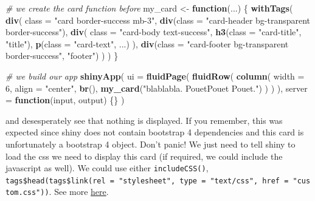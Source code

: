 \documentclass[]{book}
\newenvironment{Shaded}{\begin{snugshade}}{\end{snugshade}}
\newcommand{\CommentTok}[1]{\textcolor[rgb]{0.56,0.35,0.01}{\textit{#1}}}
\newcommand{\ControlFlowTok}[1]{\textcolor[rgb]{0.13,0.29,0.53}{\textbf{#1}}}
\newcommand{\DataTypeTok}[1]{\textcolor[rgb]{0.13,0.29,0.53}{#1}}
\newcommand{\DecValTok}[1]{\textcolor[rgb]{0.00,0.00,0.81}{#1}}
\newcommand{\KeywordTok}[1]{\textcolor[rgb]{0.13,0.29,0.53}{\textbf{#1}}}
\newcommand{\NormalTok}[1]{#1}
\newcommand{\StringTok}[1]{\textcolor[rgb]{0.31,0.60,0.02}{#1}}
\begin{document}
\begin{Shaded}
\begin{Highlighting}[]
\CommentTok{# we create the card function before}
\NormalTok{my_card <-}\StringTok{ }\ControlFlowTok{function}\NormalTok{(...) \{}
  \KeywordTok{withTags}\NormalTok{(}
    \KeywordTok{div}\NormalTok{(}
      \DataTypeTok{class =} \StringTok{"card border-success mb-3"}\NormalTok{,}
      \KeywordTok{div}\NormalTok{(}\DataTypeTok{class =} \StringTok{"card-header bg-transparent border-success"}\NormalTok{),}
      \KeywordTok{div}\NormalTok{(}
        \DataTypeTok{class =} \StringTok{"card-body text-success"}\NormalTok{,}
        \KeywordTok{h3}\NormalTok{(}\DataTypeTok{class =} \StringTok{"card-title"}\NormalTok{, }\StringTok{"title"}\NormalTok{),}
        \KeywordTok{p}\NormalTok{(}\DataTypeTok{class =} \StringTok{"card-text"}\NormalTok{, ...)}
\NormalTok{      ),}
      \KeywordTok{div}\NormalTok{(}\DataTypeTok{class =} \StringTok{"card-footer bg-transparent border-success"}\NormalTok{, }\StringTok{"footer"}\NormalTok{)}
\NormalTok{    )}
\NormalTok{  )}
\NormalTok{\}}

\CommentTok{# we build our app}
\KeywordTok{shinyApp}\NormalTok{(}
  \DataTypeTok{ui =} \KeywordTok{fluidPage}\NormalTok{(}
    \KeywordTok{fluidRow}\NormalTok{(}
      \KeywordTok{column}\NormalTok{(}
        \DataTypeTok{width =} \DecValTok{6}\NormalTok{,}
        \DataTypeTok{align =} \StringTok{"center"}\NormalTok{,}
        \KeywordTok{br}\NormalTok{(),}
        \KeywordTok{my_card}\NormalTok{(}\StringTok{"blablabla. PouetPouet Pouet."}\NormalTok{)}
\NormalTok{      )}
\NormalTok{    )}
\NormalTok{  ),}
  \DataTypeTok{server =} \ControlFlowTok{function}\NormalTok{(input, output) \{\}}
\NormalTok{)}
\end{Highlighting}
\end{Shaded}

and desesperately see that nothing is displayed. If you remember, this was expected since
shiny does not contain bootstrap 4 dependencies and this card is unfortunately a
bootstrap 4 object. Don't panic! We just need to tell shiny to load the css we need to display
this card (if required, we could include the javascript as well). We could use either
\texttt{includeCSS()}, \texttt{tags\$head(tags\$link(rel\ =\ "stylesheet",\ type\ =\ "text/css",\ href\ =\ "custom.css"))}. See
more \href{https://shiny.rstudio.com/articles/css.html}{here}.
\end{document}
